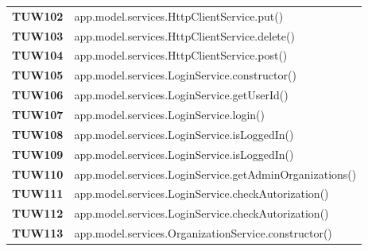 \documentclass[../../piano-di-qualifica.tex]{subfiles}
\begin{document}
\begin{longtable}[H]{>{\centering\bfseries}m{3cm} >{}m{13cm}}
  TUW102             & app.model.services.HttpClientService.put\@()                                                            \\

  TUW103             & app.model.services.HttpClientService.delete\@()                                                         \\

  TUW104             & app.model.services.HttpClientService.post\@()                                                           \\




  TUW105             & app.model.services.LoginService.constructor\@()                                                         \\

  TUW106             & app.model.services.LoginService.getUserId\@()                                                           \\

  TUW107             & app.model.services.LoginService.login\@()                                                               \\

  TUW108             & app.model.services.LoginService.isLoggedIn\@()                                                          \\

  TUW109             & app.model.services.LoginService.isLoggedIn\@()                                                          \\

  TUW110             & app.model.services.LoginService.getAdminOrganizations\@()                                               \\

  TUW111             & app.model.services.LoginService.checkAutorization\@()                                                   \\

  TUW112             & app.model.services.LoginService.checkAutorization\@()                                                   \\


  TUW113             & app.model.services.OrganizationService.constructor\@()                                                  \\


\end{longtable}
\end{document}

